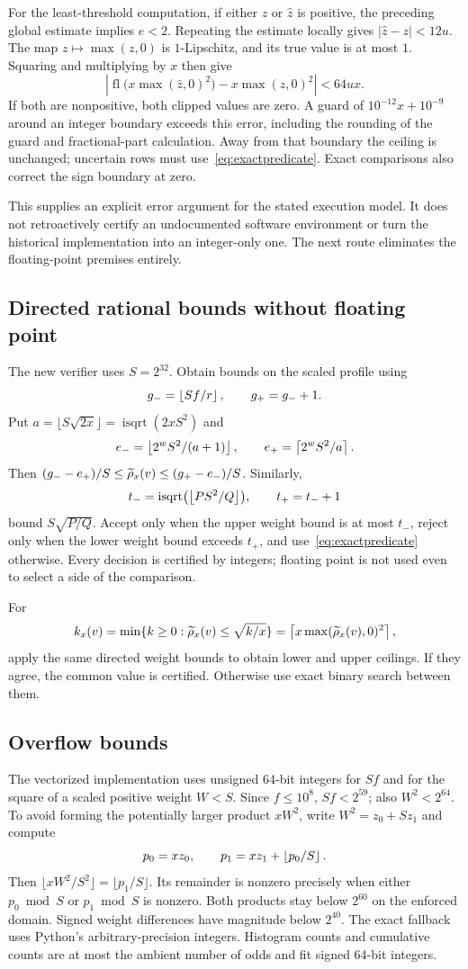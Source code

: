 For the least-threshold computation, if either $z$ or $\widehat z$ is positive, the preceding global estimate implies $e<2$. Repeating the estimate locally gives $|\widehat z-z|<12u$. The map $z\mapsto\max(z,0)$ is $1$-Lipschitz, and its true value is at most $1$. Squaring and multiplying by $x$ then give
\[
 \left|\operatorname{fl}\bigl(x\max(\widehat z,0)^2\bigr)-x\max(z,0)^2\right|<64ux.
\]
If both are nonpositive, both clipped values are zero. A guard of $10^{-12}x+10^{-9}$ around an integer boundary exceeds this error, including the rounding of the guard and fractional-part calculation. Away from that boundary the ceiling is unchanged; uncertain rows must use~\eqref{eq:exactpredicate}. Exact comparisons also correct the sign boundary at zero.

This supplies an explicit error argument for the stated execution model. It does not retroactively certify an undocumented software environment or turn the historical implementation into an integer-only one. The next route eliminates the floating-point premises entirely.

\subsection{Directed rational bounds without floating point}
The new verifier uses $S=2^{32}$. Obtain bounds on the scaled profile using
\[
 g_-=\left\lfloor Sf/r\right\rfloor,\qquad g_+=g_-+1.
\]
Put $a=\lfloor S\sqrt{2x}\rfloor=\operatorname{isqrt}(2xS^2)$ and
\[
 e_-=\left\lfloor2^wS^2/(a+1)\right\rfloor,\qquad
 e_+=\left\lceil2^wS^2/a\right\rceil.
\]
Then $(g_--e_+)/S\le\widetilde\rho_x(v)\le(g_+-e_-)/S$. Similarly,
\[
 t_-=\operatorname{isqrt}\bigl(\left\lfloor PS^2/Q\right\rfloor\bigr),\qquad t_+=t_-+1
\]
bound $S\sqrt{P/Q}$. Accept only when the upper weight bound is at most $t_-$, reject only when the lower weight bound exceeds $t_+$, and use~\eqref{eq:exactpredicate} otherwise. Every decision is certified by integers; floating point is not used even to select a side of the comparison.

For
\[
 k_x(v)=\min\{k\ge0:\widetilde\rho_x(v)\le\sqrt{k/x}\}
       =\left\lceil x\max(\widetilde\rho_x(v),0)^2\right\rceil,
\]
apply the same directed weight bounds to obtain lower and upper ceilings. If they agree, the common value is certified. Otherwise use exact binary search between them.

\subsection{Overflow bounds}
The vectorized implementation uses unsigned 64-bit integers for $Sf$ and for the square of a scaled positive weight $W<S$. Since $f\le10^8$, $Sf<2^{59}$; also $W^2<2^{64}$. To avoid forming the potentially larger product $xW^2$, write $W^2=z_0+Sz_1$ and compute
\[
 p_0=xz_0,\qquad p_1=xz_1+\left\lfloor p_0/S\right\rfloor.
\]
Then $\lfloor xW^2/S^2\rfloor=\lfloor p_1/S\rfloor$. Its remainder is nonzero precisely when either $p_0\bmod S$ or $p_1\bmod S$ is nonzero. Both products stay below $2^{60}$ on the enforced domain. Signed weight differences have magnitude below $2^{40}$. The exact fallback uses Python's arbitrary-precision integers. Histogram counts and cumulative counts are at most the ambient number of odds and fit signed 64-bit integers.

